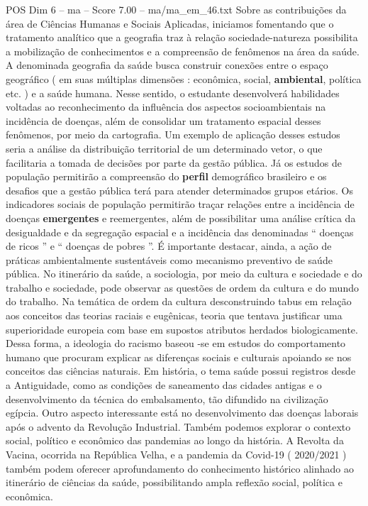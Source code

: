 \begin{textsample}{POS Dim 6 – ma – Score 7.00 – ma/ma\_em\_46.txt}
Sobre as contribuições da área de Ciências Humanas e Sociais Aplicadas, iniciamos fomentando que o tratamento analítico que a geografia traz à relação sociedade-natureza possibilita a mobilização de conhecimentos e a compreensão de fenômenos na área da saúde.
A denominada geografia da saúde busca construir conexões entre o espaço geográfico ( em suas múltiplas dimensões : econômica, social, \textbf{ambiental}, política etc. ) e a saúde humana.
Nesse sentido, o estudante desenvolverá habilidades voltadas ao reconhecimento da influência dos aspectos socioambientais na incidência de doenças, além de consolidar um tratamento espacial desses fenômenos, por meio da cartografia.
Um exemplo de aplicação desses estudos seria a análise da distribuição territorial de um determinado vetor, o que facilitaria a tomada de decisões por parte da gestão pública.
Já os estudos de população permitirão a compreensão do \textbf{perfil} demográfico brasileiro e os desafios que a gestão pública terá para atender determinados grupos etários.
Os indicadores sociais de população permitirão traçar relações entre a incidência de doenças \textbf{emergentes} e reemergentes, além de possibilitar uma análise crítica da desigualdade e da segregação espacial e a incidência das denominadas “ doenças de ricos ” e “ doenças de pobres ”.
É importante destacar, ainda, a ação de práticas ambientalmente sustentáveis como mecanismo preventivo de saúde pública.
No itinerário da saúde, a sociologia, por meio da cultura e sociedade e do trabalho e sociedade, pode observar as questões de ordem da cultura e do mundo do trabalho.
Na temática de ordem da cultura desconstruindo tabus em relação aos conceitos das teorias raciais e eugênicas, teoria que tentava justificar uma superioridade europeia com base em supostos atributos herdados biologicamente.
Dessa forma, a ideologia do racismo baseou -se em estudos do comportamento humano que procuram explicar as diferenças sociais e culturais apoiando se nos conceitos das ciências naturais.
Em história, o tema saúde possui registros desde a Antiguidade, como as condições de saneamento das cidades antigas e o desenvolvimento da técnica do embalsamento, tão difundido na civilização egípcia.
Outro aspecto interessante está no desenvolvimento das doenças laborais após o advento da Revolução Industrial.
Também podemos explorar o contexto social, político e econômico das pandemias ao longo da história.
A Revolta da Vacina, ocorrida na República Velha, e a pandemia da Covid-19 ( 2020/2021 ) também podem oferecer aprofundamento do conhecimento histórico alinhado ao itinerário de ciências da saúde, possibilitando ampla reflexão social, política e econômica.

\end{textsample}
